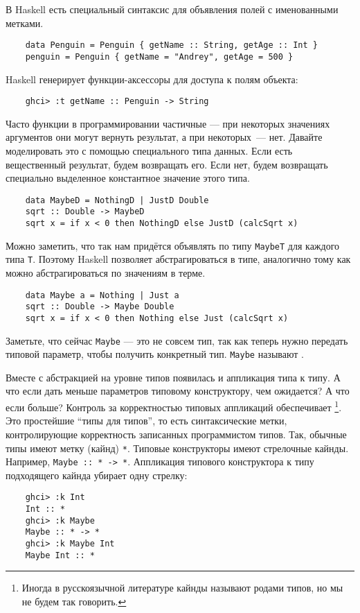 В Haskell есть специальный синтаксис для объявления полей с именованными метками.
\begin{verbatim}
    data Penguin = Penguin { getName :: String, getAge :: Int }
    penguin = Penguin { getName = "Andrey", getAge = 500 }
\end{verbatim}
Haskell генерирует функции-аксессоры для доступа к полям объекта:
\begin{verbatim}
    ghci> :t getName :: Penguin -> String
\end{verbatim}

Часто функции в программировании частичные --- при некоторых значениях аргументов они могут вернуть результат, а при некоторых~--- нет.
Давайте моделировать это с помощью специального типа данных.
Если есть вещественный результат, будем возвращать его.
Если нет, будем возвращать специально выделенное константное значение этого типа.
\begin{verbatim}
    data MaybeD = NothingD | JustD Double
    sqrt :: Double -> MaybeD
    sqrt x = if x < 0 then NothingD else JustD (calcSqrt x)
\end{verbatim}

Можно заметить, что так нам придётся объявлять по типу \texttt{MaybeT} для каждого типа \texttt{T}.
Поэтому Haskell позволяет абстрагироваться в типе, аналогично тому как можно абстрагироваться по значениям в терме.
\begin{verbatim}
    data Maybe a = Nothing | Just a
    sqrt :: Double -> Maybe Double
    sqrt x = if x < 0 then Nothing else Just (calcSqrt x)
\end{verbatim}

Заметьте, что сейчас \texttt{Maybe} --- это не совсем тип, так как теперь нужно передать типовой параметр, чтобы получить конкретный тип.
\texttt{Maybe} называют .

Вместе с абстракцией на уровне типов появилась и аппликация типа к типу.
А что если дать меньше параметров типовому конструктору, чем ожидается?
А что если больше?
Контроль за корректностью типовых аппликаций обеспечивает \footnote{Иногда в русскоязычной литературе кайнды называют родами типов, но мы не будем так говорить.}.
Это простейшие ``типы для типов'', то есть синтаксические метки, контролирующие корректность записанных программистом типов.
Так, обычные типы имеют метку (кайнд) \texttt{*}.
Типовые конструкторы имеют стрелочные кайнды.
Например, \texttt{Maybe :: * -> *}.
Аппликация типового конструктора к типу подходящего кайнда убирает одну стрелку:
\begin{verbatim}
    ghci> :k Int
    Int :: *
    ghci> :k Maybe
    Maybe :: * -> *
    ghci> :k Maybe Int
    Maybe Int :: *
\end{verbatim}

